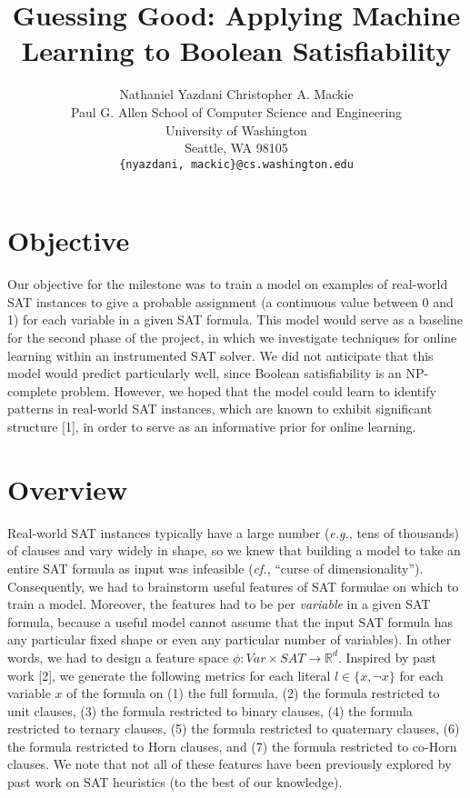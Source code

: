 \documentclass{article}
\title{Guessing Good: Applying Machine Learning to Boolean Satisfiability}
\author{
    Nathaniel Yazdani \quad Christopher A. Mackie\\
    Paul G. Allen School of Computer Science and Engineering\\
    University of Washington\\
    Seattle, WA 98105\\
    \texttt{\{nyazdani, mackic\}@cs.washington.edu}\\
}
\begin{document}

\maketitle

\section*{Objective}
Our objective for the milestone was to train a model on examples of
real-world SAT instances to give a probable assignment (a continuous value
between 0 and 1) for each variable in a given SAT formula. This model would
serve as a baseline for the second phase of the project, in which we investigate
techniques for online learning within an instrumented SAT solver. We did not
anticipate that this model would predict particularly well, since Boolean
satisfiability is an NP-complete problem. However, we hoped that the model
could learn to identify patterns in real-world SAT instances, which are known
to exhibit significant structure [1], in order to serve as an informative prior
for online learning.

\section*{Overview}
Real-world SAT instances typically have a large number (\textit{e.g.}, tens of
thousands) of clauses and vary widely in shape, so we knew that building a model
to take an entire SAT formula as input was infeasible (\textit{cf.}, ``curse of
dimensionality''). Consequently, we had to brainstorm useful features of SAT
formulae on which to train a model. Moreover, the features had to be per
\emph{variable} in a given SAT formula, because a useful model cannot assume
that the input SAT formula has any particular fixed shape or even any particular
number of variables). In other words, we had to design a feature space $\phi :
Var \times SAT \rightarrow \mathbb{R}^d$. Inspired by past work [2], we generate
the following metrics for each literal $l \in \{x, \neg x\}$ for each variable
$x$ of the formula on (1) the full formula, (2) the formula restricted to unit
clauses, (3) the formula restricted to binary clauses, (4) the formula
restricted to ternary clauses, (5) the formula restricted to quaternary clauses,
(6) the formula restricted to Horn clauses, and (7) the formula restricted to
co-Horn clauses. We note that not all of these features have been previously
explored by past work on SAT heuristics (to the best of our knowledge).
\end{document}
